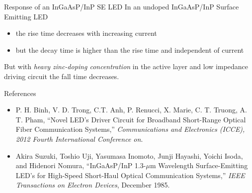 \documentclass[mathserif]{beamer}
\begin{document}
    
    \begin{frame}{Response of an InGaAsP/InP SE LED}
        \pause
        In an undoped InGaAsP/InP Surface Emitting LED
        \begin{itemize}
            \pause \item the rise time decreases with increasing current
            \pause \item but the decay time is higher than the rise time and independent of current
        \end{itemize}
        \pause
 	    \begin{figure}
             \centering
        \end{figure}
        \pause
        But with \emph{heavy zinc-doping concentration} in the active layer and low impedance driving circuit the fall time decreases.
    \end{frame}
    
    

    
    \begin{frame}{References}
        \pause
        \begin{itemize}
                 \item P. H. Binh, V. D. Trong, C.T. Anh, P. Renucci, X. Marie, C. T. Truong, A. T. Pham, ``Novel LED's Driver Circuit for Broadband Short-Range Optical Fiber Communication Systems,'' \emph{Communications and Electronics (ICCE), 2012 Fourth International Conference on}.
                 \item Akira Suzuki, Toshio Uji, Yasumasa Inomoto, Junji Hayashi, Yoichi Isoda, and Hidenori Nomura, ``InGaAsP/InP 1.3-$\mu$m Wavelength Surface-Emitting LED's for High-Speed Short-Haul Optical Communication Systems,'' \emph{IEEE Transactions on Electron Devices}, December 1985.
        \end{itemize}
    \end{frame}
    
    
\end{document}
